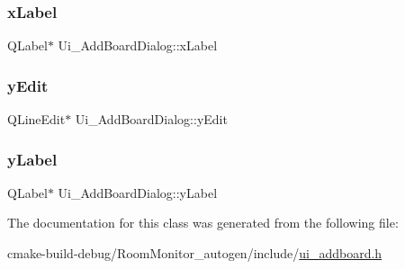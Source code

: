\subsubsection{\texorpdfstring{x\+Label}{xLabel}}
{\footnotesize\ttfamily Q\+Label$\ast$ Ui\+\_\+\+Add\+Board\+Dialog\+::x\+Label}

\mbox{\label{class_ui___add_board_dialog_a293ea53c69dfd36892d95f72ccd373c9}} 
\subsubsection{\texorpdfstring{y\+Edit}{yEdit}}
{\footnotesize\ttfamily Q\+Line\+Edit$\ast$ Ui\+\_\+\+Add\+Board\+Dialog\+::y\+Edit}

\mbox{\label{class_ui___add_board_dialog_af24ba730b7cb63f6fd7240634d7d4d32}} 
\subsubsection{\texorpdfstring{y\+Label}{yLabel}}
{\footnotesize\ttfamily Q\+Label$\ast$ Ui\+\_\+\+Add\+Board\+Dialog\+::y\+Label}



The documentation for this class was generated from the following file\+:\begin{DoxyCompactItemize}
\item 
cmake-\/build-\/debug/\+Room\+Monitor\+\_\+autogen/include/\hyperlink{ui__addboard_8h}{ui\+\_\+addboard.\+h}\end{DoxyCompactItemize}
